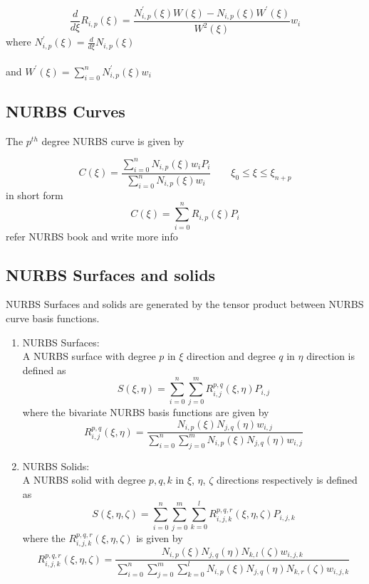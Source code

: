 \documentclass[12pt]{article}
\begin{document}
\begin{equation}
\frac{d }{d \xi} R_{i,p}(\xi) = \frac{N^{'}_{i,p}(\xi)  W(\xi) - N_{i,p}(\xi)  W^{'}(\xi)}{W^{2}(\xi)}w_{i}
\end{equation}
\noindent
where
$N^{'}_{i,p}(\xi) = \frac{d }{d \xi} N_{i,p}(\xi)$  \\
\\
\noindent
and $W^{'}(\xi) =  \sum_{i=0}^{n}N^{'}_{i,p}(\xi) w_i$


\subsection{NURBS Curves }
The $p^{th}$ degree NURBS curve is given by

\begin{equation}
C(\xi) = \frac{\sum_{i=0}^{n}N_{i,p}(\xi)w_{i}P_{i}}{\sum_{i=0}^{n}N_{i,p}(\xi)w_{i}}
\qquad \xi_0 \leq \xi \leq \xi_{n+p}
\end{equation}
in short form
\begin{equation}
C(\xi) = \sum_{i=0}^{n}R_{i,p}(\xi)P_{i}
\end{equation}
refer NURBS book and write more info
\subsection{NURBS Surfaces and solids }
NURBS Surfaces and solids are generated by the tensor product between NURBS curve basis functions.
\begin{enumerate}[leftmargin=*]
	\item NURBS Surfaces: \\
	A NURBS surface with degree $p$ in $\xi$ direction and degree $q$ in $\eta$ direction is defined as
	\begin{equation}
	S(\xi,\eta) = \sum_{i=0}^{n}\sum_{j=0}^{m} R_{i,j}^{p,q}(\xi,\eta)  P_{i,j}
	\end{equation}
	where the bivariate NURBS basis functions are given by
	\begin{equation}
	R_{i,j}^{p,q}(\xi,\eta)  = \frac{N_{i,p}(\xi)N_{j,q}(\eta)w_{i,j}}{\sum_{i=0}^{n}\sum_{j=0}^{m}N_{i,p}(\xi)N_{j,q}(\eta)w_{i,j}}
	\end{equation}
	\item NURBS Solids: \\
	A NURBS solid with degree $p,q,k$ in $\xi$, $\eta$, $\zeta$ directions respectively is defined as
	\begin{equation}
	S(\xi,\eta,\zeta) = \sum_{i=0}^{n}\sum_{j=0}^{m}\sum_{k=0}^{l} R_{i,j,k}^{p,q,r}(\xi,\eta,\zeta)  P_{i,j,k}
	\end{equation}
	where the $R_{i,j,k}^{p,q,r}(\xi,\eta,\zeta)$ is given by
	\begin{equation}
	R_{i,j,k}^{p,q,r}(\xi,\eta,\zeta)  = \frac{N_{i,p}(\xi)N_{j,q}(\eta)N_{k,l}(\zeta)w_{i,j,k}}{\sum_{i=0}^{n}\sum_{j=0}^{m} \sum_{k=0}^{l} N_{i,p}(\xi)N_{j,q}(\eta)N_{k,r}(\zeta)w_{i,j,k}}
	\end{equation}
\end{enumerate}
\end{document}
